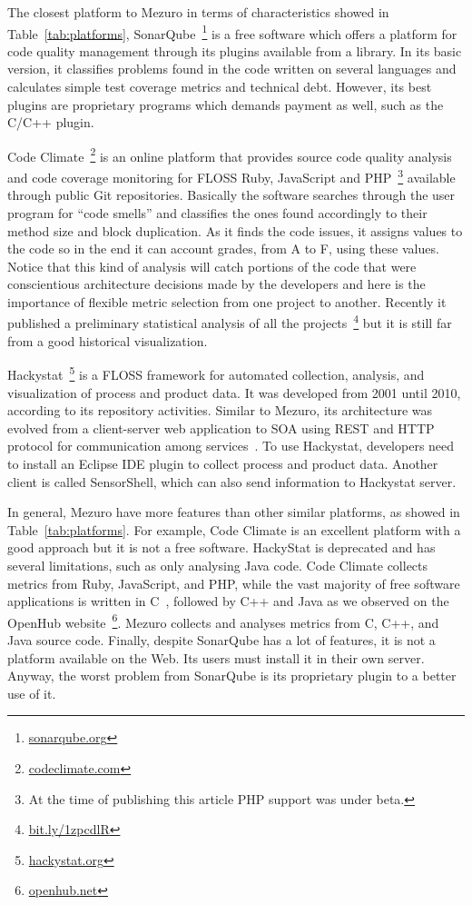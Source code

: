 The closest platform to Mezuro in terms of characteristics showed in Table~\ref{tab:platforms},
SonarQube~\footnote{\url{sonarqube.org}} is a free software which offers a
platform for code quality management through its plugins available from a
library. In its basic version, it classifies problems found in the code written
on several languages and calculates simple test coverage metrics and technical
debt. However, its best plugins are proprietary programs which demands payment
as well, such as the C/C++ plugin.

Code Climate~\footnote{\url{codeclimate.com}} is an online
platform that provides source code quality analysis and code coverage
monitoring for FLOSS Ruby, JavaScript and PHP~\footnote{At the
time of publishing this article PHP support was under beta.} available through
public Git repositories. Basically the software searches through the user
program for ``code smells'' and classifies the ones found accordingly to their
method size and block duplication. As it finds the code issues, it assigns
values to the code so in the end it can account grades, from A to F, using
these values. Notice that this kind of analysis will catch portions of the code
that were conscientious architecture decisions made by the developers and here
is the importance of flexible metric selection from one project to another.
Recently it published a preliminary statistical analysis of all the
projects~\footnote{\url{bit.ly/1zpcdlR}}
but it is still far from a good historical visualization.

Hackystat~\footnote{\url{hackystat.org}} is a FLOSS framework for
automated collection, analysis, and visualization of process and product data.
It was developed from 2001 until 2010, according to its repository activities.
Similar to Mezuro, its architecture was evolved from a client-server web
application to SOA using REST and HTTP protocol for communication among
services~\cite{chauhan2011}.  To use Hackystat, developers need to install an
Eclipse IDE plugin to collect process and product data. Another client is
called SensorShell, which can also send information to Hackystat server.

In general, Mezuro have more features than other similar platforms, as showed
in Table~\ref{tab:platforms}. For example, Code Climate is an excellent
platform with a good approach but it is not a free software. HackyStat is
deprecated and has several limitations, such as only analysing Java code. Code
Climate collects metrics from Ruby, JavaScript, and PHP, while the vast
majority of free software applications is written in C~\cite{robles2006},
followed by C++ and Java as we observed on the OpenHub
website~\footnote{\url{openhub.net}}. Mezuro collects and analyses metrics from
C, C++, and Java source code. Finally, despite SonarQube has a lot of features,
it is not a platform available on the Web. Its users must install it in their
own server. Anyway, the worst problem from SonarQube is its proprietary plugin
to a better use of it.

